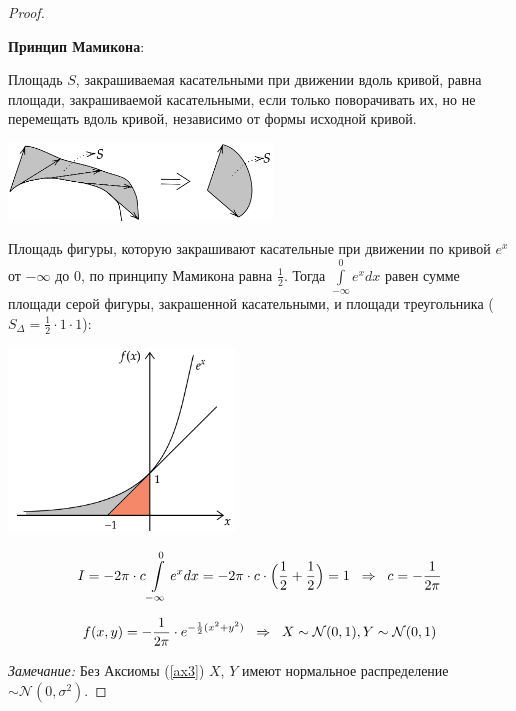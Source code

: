 \documentclass[12pt]{article} %
\theoremstyle{definition} %
\def \cN{\mathcal{N}}
\begin{document}
\begin{proof}
\begin{itemize}[label={$\bullet$}]
            \textbf{Принцип Мамикона}: \par
            Площадь $S$, закрашиваемая касательными при движении вдоль кривой, равна площади, закрашиваемой касательными, если только поворачивать их, но не перемещать вдоль кривой, независимо от формы исходной кривой.\par
            \begin{center}
               \includegraphics[width=7cm]{images/pic05_06.png}
            \end{center}
            Площадь фигуры, которую закрашивают касательные при движении по кривой $e^x$ от $-\infty$ до $0$, по принципу Мамикона равна $\frac{1}{2}$. Тогда $\int\limits_{-\infty}^{0}e^{x}dx$ равен сумме площади серой фигуры, закрашенной касательными, и площади треугольника ($S_{\Delta}=\frac{1}{2}\cdot 1 \cdot 1$):
            \begin{center}
               \includegraphics[width=6cm]{images/pic06_06.png}
            \end{center}
            \[
            I = -2\pi \cdot c \int\limits_{-\infty}^{0}e^{x}dx = -2\pi \cdot c \cdot \Big(\frac{1}{2} + \frac{1}{2}\Big) = 1 \hspace{0.2cm} \Rightarrow \hspace{0.2cm} c = -\frac{1}{2\pi} \] \par
            \[
             f(x,y) = -\frac{1}{2\pi} \cdot e^{-\frac{1}{2}(x^2+y^2)} \hspace{0.2cm} \Rightarrow \hspace{0.2cm} X \sim \cN(0, 1), Y \sim \cN(0, 1)
            \]
    \end{itemize}

    \emph{Замечание:} Без Аксиомы (\ref{ax3}) $X$, $Y$ имеют нормальное распределение $\sim \cN(0, \sigma^2)$.
\end{proof}
\end{document}
